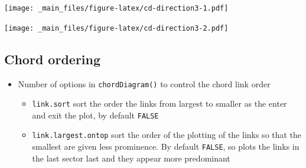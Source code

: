 \documentclass[
]{book}
\newenvironment{Shaded}{\begin{snugshade}}{\end{snugshade}}
\newcommand{\AttributeTok}[1]{\textcolor[rgb]{0.77,0.63,0.00}{#1}}
\newcommand{\CommentTok}[1]{\textcolor[rgb]{0.56,0.35,0.01}{\textit{#1}}}
\newcommand{\DecValTok}[1]{\textcolor[rgb]{0.00,0.00,0.81}{#1}}
\newcommand{\FloatTok}[1]{\textcolor[rgb]{0.00,0.00,0.81}{#1}}
\newcommand{\FunctionTok}[1]{\textcolor[rgb]{0.00,0.00,0.00}{#1}}
\newcommand{\NormalTok}[1]{#1}
\newcommand{\SpecialCharTok}[1]{\textcolor[rgb]{0.00,0.00,0.00}{#1}}
\newcommand{\StringTok}[1]{\textcolor[rgb]{0.31,0.60,0.02}{#1}}
\providecommand{\tightlist}{%
  \setlength{\itemsep}{0pt}\setlength{\parskip}{0pt}}
\begin{document}
\texttt{[image: \_main\_files/figure-latex/cd-direction3-1.pdf]}

\begin{Shaded}
\end{Shaded}

\texttt{[image: \_main\_files/figure-latex/cd-direction3-2.pdf]}

\hypertarget{chord-ordering}{%
\subsection{Chord ordering}\label{chord-ordering}}

\begin{itemize}
\tightlist
\item
  Number of options in \texttt{chordDiagram()} to control the chord link order

  \begin{itemize}
  \tightlist
  \item
    \texttt{link.sort} sort the order the links from largest to smaller as the enter and exit the plot, by default \texttt{FALSE}
  \item
    \texttt{link.largest.ontop} sort the order of the plotting of the links so that the smallest are given less prominence. By default \texttt{FALSE}, so plots the links in the last sector last and they appear more predominant
  \end{itemize}
\end{itemize}
\end{document}
